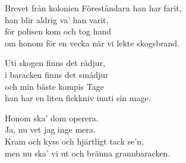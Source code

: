 \begin{song}{Brevet från kolonien}
    \showversenumber
	Föreståndarn han har farit,\\
	han blir aldrig va' han varit,\\
	för polisen kom och tog hand\\
	om honom för en vecka när vi lekte skogsbrand.
	
    \showversenumber
	Uti skogen finns det rådjur,\\
	i baracken finns det smådjur\\
	och min bäste kompis Tage\\
	han har en liten fickkniv inuti sin mage.
	
    \showversenumber
	Honom ska' dom operera.\\
	Ja, nu vet jag inge mera.\\
	Kram och kyss och hjärtligt tack se'n,\\
	men nu ska' vi ut och bränna grannbaracken.
	
\end{song}
